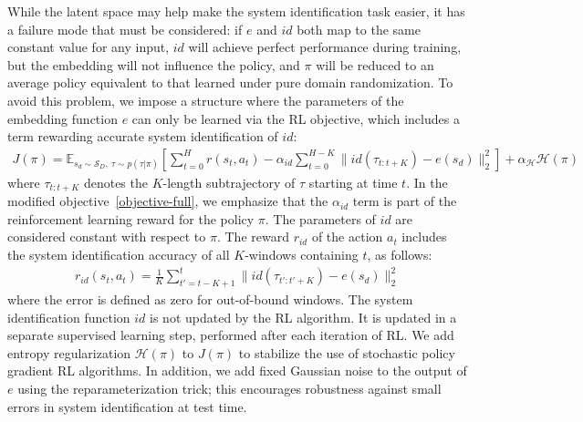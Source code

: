 \documentclass{article}
\newcommand{\E}{\mathbb{E}}
\newcommand{\TODO}[1]{\textcolor{red}{\textbf{TODO: #1}}}
\newcommand{\cH}{\mathcal{H}}
\newcommand{\cN}{\mathcal{N}}
\newcommand{\cS}{\mathcal{S}}
\DeclareMathOperator*{\argmax}{argmax}
\newcommand{\embedfn}{e}
\newcommand{\idfn}{id}
\begin{document}
While the latent space may help make the system identification task easier,
it has a failure mode that must be considered:
if $\embedfn$ and $\idfn$ both map to the same constant value for any input,
$\idfn$ will achieve perfect performance during training,
but the embedding will not influence the policy, and $\pi$ will be reduced to an average policy
equivalent to that learned under pure domain randomization.
To avoid this problem, we impose a structure where the parameters of the embedding function $e$
can only be learned via the RL objective, which includes a term rewarding accurate system identification of $id$:
\begin{equation}\begin{split}
J(\pi) = 
\E_{s_d \sim \cS_D,\ \tau \sim p(\tau|\pi)}
\left[
\sum_{t = 0}^H r(s_t, a_t)
- \alpha_{id} \sum_{t = 0}^{H-K} \| \idfn(\tau_{t:t+K}) - \embedfn(s_d) \|_2^2
\right]
+ \alpha_{\cH}\cH(\pi)
\label{objective-full}
\end{split}\end{equation}
where $\tau_{t:t+K}$ denotes the $K$-length subtrajectory of $\tau$ starting at time $t$.
In the modified objective~\eqref{objective-full},
we emphasize that the $\alpha_{id}$ term is part of the reinforcement learning reward
for the policy $\pi$.
The parameters of $\idfn$ are considered constant with respect to $\pi$.
The reward $r_{\idfn}$ of the action $a_t$ includes the system identification accuracy
of all $K$-windows containing $t$, as follows:
\begin{equation}\begin{split}
r_{\idfn}(s_t, a_t) = \frac{1}{K}
\sum_{t' = t - K + 1}^t
\| \idfn(\tau_{t':t'+K}) - \embedfn(s_d) \|_2^2
\label{sysid-reward}
\end{split}\end{equation}
where the error is defined as zero for out-of-bound windows.
The system identification function $\idfn$ is not updated by the RL algorithm.
It is updated in a separate supervised learning step, performed after each iteration of RL.
We add entropy regularization $\cH(\pi)$ to $J(\pi)$ to stabilize the use of stochastic policy gradient RL algorithms.
In addition, we add fixed Gaussian noise to the output of $\embedfn$ using the reparameterization trick; this encourages robustness against small errors in system identification at test time.
\end{document}
